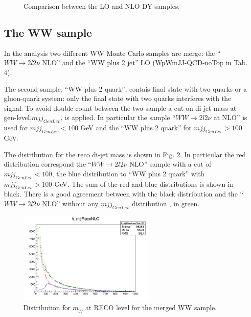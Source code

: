 \begin{figure}[htbp]
{}
\caption{
    Comparison between the LO and NLO DY samples.}
    \label{fig:LOvsNLO}
\end{figure}


\subsection{The WW sample}

In the analysis two different WW Monte Carlo samples are merge: the ``$WW \rightarrow 2l 2\nu$ NLO'' and the ``WW plus 2 jet'' LO (WpWmJJ-QCD-noTop in Tab. 4). 

The second sample,  ``WW plus 2 quark'', contais final state with two quarks or a gluon-quark system: only the final state with two quarks interferes with the signal.
To avoid double count between the two sample a cut on di-jet mass at gen-level,$mjj_{GenLev}$, is applied. In particular the sample ``$WW \rightarrow 2l 2\nu$ at NLO'' is used for $mjj_{GenLev} <100$ GeV and the ``WW plus 2 quark'' for $mjj_{GenLev} >100$ GeV.

The  distribution for the reco di-jet mass is shown in Fig. \ref{fig:WW}. In particular the red distribution correspond the ``$WW \rightarrow 2l 2\nu$ NLO'' sample with a cut of  $mjj_{GenLev} <100$, the blue distribution to  ``WW plus 2 quark'' with $mjj_{GenLev} >100$ GeV. The sum of the red and blue distributions is shown in black. There is a good agreement between with the black distribution and the ``$WW \rightarrow 2l 2\nu$ NLO'' without any  $mjj_{GenLev}$ distribution , in green.



\begin{figure}[htbp]
\centering
\includegraphics[width=0.6\textwidth]{Figs/WW_distribution.png}
\caption{
    Distribution for $m_{jj}$ at RECO level for the merged WW sample.}
    \label{fig:WW}
\end{figure}

